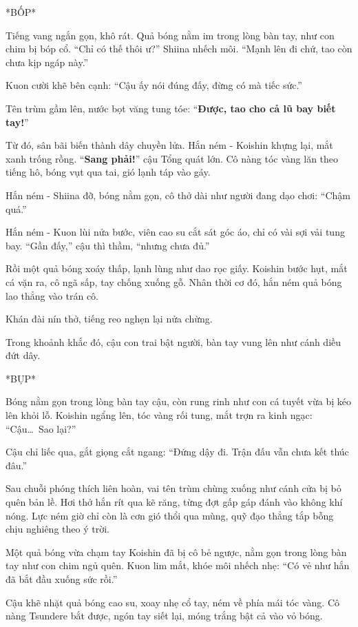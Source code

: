 \documentclass[../main.tex]{subfiles}
\begin{document}
*BỐP*

Tiếng vang ngắn gọn, khô rát. Quả bóng nằm im trong lòng bàn tay, như con chim bị bóp cổ. ``Chỉ có thế thôi ư?'' Shiina nhếch môi. ``Mạnh lên đi chứ, tao còn chưa kịp ngáp này.''

Kuon cười khẽ bên cạnh: ``Cậu ấy nói đúng đấy, đừng có mà tiếc sức.''

Tên trùm gầm lên, nước bọt văng tung tóe: ``\textbf{Được, tao cho cả lũ bay biết tay!}''

Từ đó, sân bãi biến thành dây chuyền lửa. Hắn ném - Koishin khựng lại, mắt xanh trống rồng. ``\textbf{Sang phải!}'' cậu Tổng quát lớn. Cô nàng tóc vàng lăn theo tiếng hô, bóng vụt qua tai, gió lạnh táp vào gáy.

Hắn ném - Shiina đỡ, bóng nằm gọn, cô thở dài như người đang dạo chơi: ``Chậm quá.''

Hắn ném - Kuon lùi nửa bước, viên cao su cắt sát góc áo, chỉ có vài sợi vải tung bay. ``Gần đấy,'' cậu thì thầm, ``nhưng chưa đủ.''

Rồi một quả bóng xoáy thấp, lạnh lùng như dao rọc giấy. Koishin bước hụt, mắt cá vặn ra, cô ngã sấp, tay chống xuống gỗ. Nhân thời cơ đó, hắn ném quả bóng lao thẳng vào trán cô.

Khán đài nín thở, tiếng reo nghẹn lại nửa chừng.

Trong khoảnh khắc đó, cậu con trai bật người, bàn tay vung lên như cánh diều đứt dây.

*BỤP*

Bóng nằm gọn trong lòng bàn tay cậu, còn rung rinh như con cá tuyết vừa bị kéo lên khỏi lỗ. Koishin ngẩng lên, tóc vàng rối tung, mắt trợn ra kinh ngạc: ``Cậu\dots\ Sao lại?''

Cậu chỉ liếc qua, gắt giọng cắt ngang: ``Đứng dậy đi. Trận đấu vẫn chưa kết thúc đâu.''

\ct

Sau chuỗi phóng thích liên hoàn, vai tên trùm chùng xuống như cánh cửa bị bỏ quên bản lề. Hơi thở hắn rít qua kẽ răng, từng đợt gấp gáp đánh vào không khí nóng. Lực ném giờ chỉ còn là cơn gió thổi qua mùng, quỹ đạo thẳng tắp bỗng chịu nghiêng theo ý trời.

Một quả bóng vừa chạm tay Koishin đã bị cô bẻ ngược, nằm gọn trong lòng bàn tay như con chim ngủ quên.   Kuon lim mắt, khóe môi nhếch nhẹ: ``Có vẻ như hắn đã bắt đầu xuống sức rồi.''

Cậu khẽ nhặt quả bóng cao su, xoay nhẹ cổ tay, ném về phía mái tóc vàng. Cô nàng Tsundere bắt được, ngón tay siết lại, móng trắng bật cả vào vỏ bóng.
\end{document}
